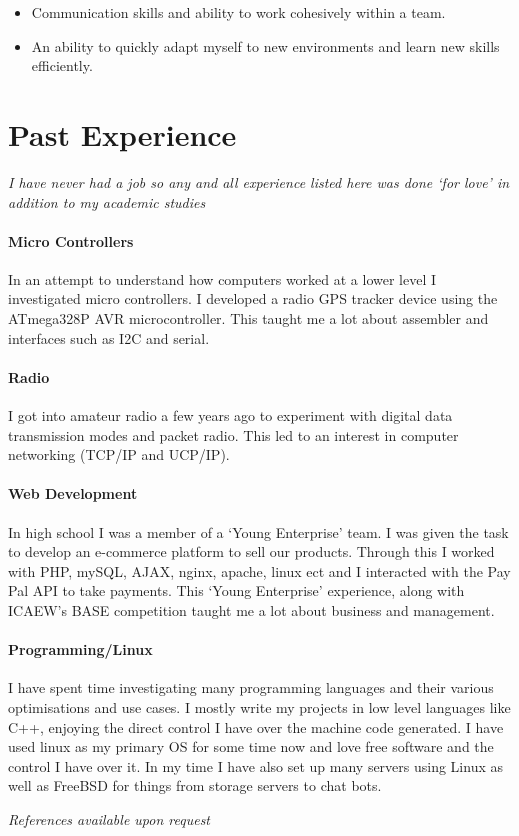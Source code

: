\documentclass[9pt,a4paper]{article}
\begin{document}
\begin{multicols*}{2}
\begin{itemize}
\item Communication skills and ability to work cohesively within a team.

\item An ability to quickly adapt myself to new environments and learn new skills efficiently.
\end{itemize}

\section*{Past Experience}
\textit{I have never had a job so any and all experience listed here was done `for love' in addition to my academic studies}

\paragraph{Micro Controllers} In an attempt to understand how computers worked at a lower level I investigated micro controllers.
I developed a radio GPS tracker device using the ATmega328P AVR microcontroller.
This taught me a lot about assembler and interfaces such as I2C and serial.

\paragraph{Radio} I got into amateur radio a few years ago to experiment with digital data transmission modes and packet radio.
This led to an interest in computer networking (TCP/IP and UCP/IP).

\paragraph{Web Development} In high school I was a member of a `Young Enterprise' team.
I was given the task to develop an e-commerce platform to sell our products.
Through this I worked with PHP, mySQL, AJAX, nginx, apache, linux ect
and I interacted with the Pay Pal API to take payments.
This `Young Enterprise' experience, along with ICAEW's BASE competition taught me a lot about business and management.

\paragraph{Programming/Linux} I have spent time investigating many programming languages and their various optimisations and use cases.
I mostly write my projects in low level languages like C++, enjoying the direct control I have over the machine code generated.
I have used linux as my primary OS for some time now and love free software and the control I have over it.
In my time I have also set up many servers using Linux as well as FreeBSD for things from storage servers to chat bots.

\vfill
\textit{References available upon request}
\end{multicols*}
\end{document}
